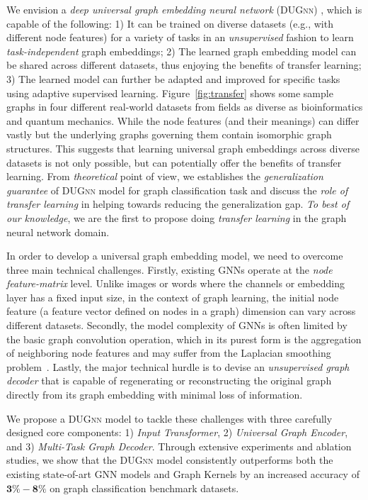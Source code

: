 \documentclass{article}
\begin{document}
We envision a {\em deep universal graph  embedding neural network} (\textsc{DUGnn})	, which is  capable of the following: 1) It can be trained on diverse datasets (e.g., with different node features) for a variety of tasks in an {\em unsupervised} fashion to learn  {\em task-independent} graph embeddings; 2) The learned graph embedding model can be shared across different datasets, thus enjoying the benefits of   transfer learning; 3) The learned model can  further be adapted and improved for specific tasks using adaptive supervised learning.  Figure~\ref{fig:transfer} shows some sample graphs in four different real-world datasets from fields as diverse as bioinformatics and quantum mechanics. While the node features (and their meanings) can differ vastly but the underlying graphs governing them contain isomorphic graph structures. This   suggests that learning universal graph embeddings across diverse datasets is not only possible, but can potentially offer the benefits of transfer learning. From \emph{theoretical} point of view, we establishes the \emph{generalization guarantee} of  \textsc{DUGnn} model for graph classification task and discuss the \emph{role of transfer learning} in helping towards reducing the generalization gap. \emph{To best of our knowledge}, we are the first to propose doing \emph{transfer learning}    in the graph neural network domain.

In order to develop a universal graph embedding model, we need to overcome three main technical challenges.  Firstly, existing GNNs  operate at the {\em node feature-matrix} level.
Unlike images or words where the channels or embedding layer has a fixed input size,  in the context of graph learning, the initial node feature (a feature vector defined on nodes in a graph)   dimension can vary across different datasets. Secondly, the model complexity of GNNs is often  limited by the basic graph convolution operation, which in its purest form is the aggregation of neighboring node features and may suffer from the Laplacian smoothing problem~\cite{li2018deeper}. Lastly, the major technical hurdle is to devise an {\em unsupervised graph decoder} that is capable of regenerating or reconstructing the original graph directly from its graph embedding with minimal loss of information. 





We propose a \textsc{DUGnn} model   to tackle these challenges  with three carefully designed core components: 1) {\em Input Transformer}, 2) {\em Universal Graph Encoder}, and   3) {\em Multi-Task Graph Decoder}. 
Through extensive experiments and ablation studies, we show that the   \textsc{DUGnn}  model consistently outperforms both the existing state-of-art GNN models and Graph Kernels by an increased accuracy of $\mathbf{3\textbf{\%}-8\textbf{\%}}$ on  graph classification benchmark datasets.
\end{document}
